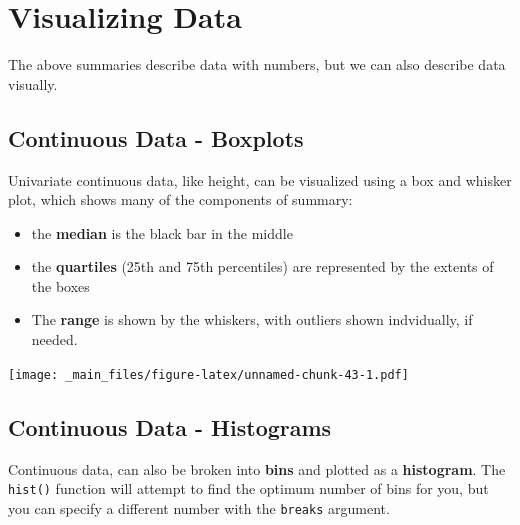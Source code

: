 \documentclass[
]{book}
\newenvironment{Shaded}{\begin{snugshade}}{\end{snugshade}}
\newcommand{\AttributeTok}[1]{\textcolor[rgb]{0.13,0.29,0.53}{#1}}
\newcommand{\FunctionTok}[1]{\textcolor[rgb]{0.13,0.29,0.53}{\textbf{#1}}}
\newcommand{\NormalTok}[1]{#1}
\newcommand{\SpecialCharTok}[1]{\textcolor[rgb]{0.81,0.36,0.00}{\textbf{#1}}}
\newcommand{\StringTok}[1]{\textcolor[rgb]{0.31,0.60,0.02}{#1}}
\providecommand{\tightlist}{%
  \setlength{\itemsep}{0pt}\setlength{\parskip}{0pt}}
\begin{document}
\hypertarget{visualizing-data-1}{%
\section{Visualizing Data}\label{visualizing-data-1}}

The above summaries describe data with numbers, but we can also describe data visually.

\hypertarget{continuous-data---boxplots}{%
\subsection{Continuous Data - Boxplots}\label{continuous-data---boxplots}}

Univariate continuous data, like height, can be visualized using a box and whisker plot, which shows many of the components of summary:

\begin{itemize}
\tightlist
\item
  the \textbf{median} is the black bar in the middle
\item
  the \textbf{quartiles} (25th and 75th percentiles) are represented by the extents of the boxes
\item
  The \textbf{range} is shown by the whiskers, with outliers shown indvidually, if needed.
\end{itemize}

\begin{Shaded}
\end{Shaded}

\texttt{[image: \_main\_files/figure-latex/unnamed-chunk-43-1.pdf]}

\hypertarget{continuous-data---histograms}{%
\subsection{Continuous Data - Histograms}\label{continuous-data---histograms}}

Continuous data, can also be broken into \textbf{bins} and plotted as a \textbf{histogram}. The \texttt{hist()} function will attempt to find the optimum number of bins for you, but you can specify a different number with the \texttt{breaks} argument.

\begin{Shaded}
\end{Shaded}
\end{document}
